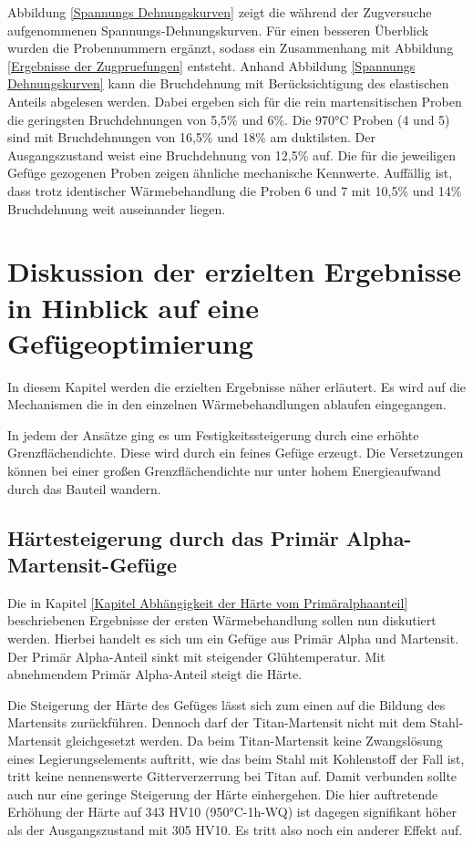 \documentclass[a4paper, 11pt]{tubsreprt}
\begin{document}
Abbildung \ref{Spannungs Dehnungskurven} zeigt die während der Zugversuche aufgenommenen Spannungs-Dehnungskurven. Für einen besseren Überblick wurden die Probennummern ergänzt, sodass ein Zusammenhang mit Abbildung \ref{Ergebnisse der Zugpruefungen} entsteht. Anhand Abbildung \ref{Spannungs Dehnungskurven} kann die Bruchdehnung mit Berücksichtigung des elastischen Anteils abgelesen werden. Dabei ergeben sich für die rein martensitischen Proben die geringsten Bruchdehnungen  von 5,5\% und 6\%. Die 970°C Proben (4 und 5) sind mit Bruchdehnungen von 16,5\% und 18\% am duktilsten. Der Ausgangszustand weist eine Bruchdehnung von 12,5\% auf. Die für die jeweiligen Gefüge gezogenen Proben zeigen ähnliche mechanische Kennwerte. Auffällig ist, dass trotz identischer Wärmebehandlung die Proben 6 und 7 mit 10,5\% und 14\% Bruchdehnung weit auseinander liegen.

\chapter{Diskussion der erzielten Ergebnisse in Hinblick auf eine Gefügeoptimierung}
In diesem Kapitel werden die erzielten Ergebnisse näher erläutert. Es wird auf die Mechanismen die in den  einzelnen Wärmebehandlungen ablaufen eingegangen.

In jedem der Ansätze ging es um Festigkeitssteigerung durch eine erhöhte Grenzflächendichte. Diese wird durch ein feines Gefüge erzeugt. Die Versetzungen können bei einer großen Grenzflächendichte nur unter hohem Energieaufwand durch das Bauteil wandern. 
\section{Härtesteigerung durch das Primär Alpha-Martensit-Gefüge}\label{Kapitel einfluss des Primäralphaanteils}
Die in Kapitel \ref{Kapitel Abhängigkeit der Härte vom Primäralphaanteil} beschriebenen Ergebnisse der ersten Wärmebehandlung sollen nun diskutiert werden. Hierbei handelt es sich um ein Gefüge aus Primär Alpha und Martensit. Der Primär Alpha-Anteil sinkt mit steigender Glühtemperatur. Mit abnehmendem Primär Alpha-Anteil steigt die Härte.


Die Steigerung der Härte des Gefüges lässt sich zum einen auf die Bildung des Martensits zurückführen. Dennoch darf der Titan-Martensit nicht mit dem Stahl-Martensit gleichgesetzt werden. Da beim Titan-Martensit keine Zwangslösung eines Legierungselements auftritt, wie das beim Stahl mit Kohlenstoff der Fall ist, tritt keine nennenswerte Gitterverzerrung bei Titan auf. Damit verbunden sollte auch nur eine geringe Steigerung der Härte einhergehen. Die hier auftretende Erhöhung der Härte auf 343 HV10 (950°C-1h-WQ) ist dagegen signifikant höher als der Ausgangszustand mit 305 HV10. Es tritt also noch ein anderer Effekt auf.
\end{document}
